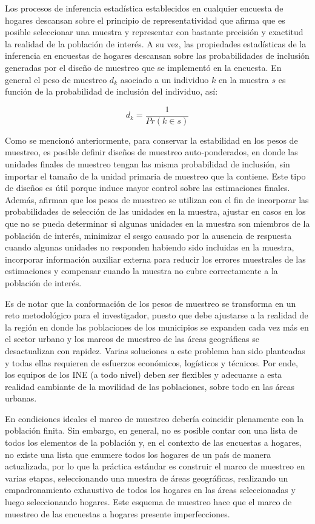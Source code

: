 \documentclass[
  12pt,
]{book}
\begin{document}
Los procesos de inferencia estadística establecidos en cualquier encuesta de hogares descansan sobre el principio de representatividad que afirma que es posible seleccionar una muestra y representar con bastante precisión y exactitud la realidad de la población de interés. A su vez, las propiedades estadísticas de la inferencia en encuestas de hogares descansan sobre las probabilidades de inclusión generadas por el diseño de muestreo que se implementó en la encuesta. En general el peso de muestreo \(d_k\) asociado a un individuo \(k\) en la muestra \(s\) es función de la probabilidad de inclusión del individuo, así:

\[
d_k = \frac{1}{Pr(k\in s)}
\]

Como se mencionó anteriormente, para conservar la estabilidad en los pesos de muestreo, es posible definir diseños de muestreo auto-ponderados, en donde las unidades finales de muestreo tengan las misma probabilidad de inclusión, sin importar el tamaño de la unidad primaria de muestreo que la contiene. Este tipo de diseños es útil porque induce mayor control sobre las estimaciones finales. Además, \citet{Valliant_Dever_2017} afirman que los pesos de muestreo se utilizan con el fin de incorporar las probabilidades de selección de las unidades en la muestra, ajustar en casos en los que no se pueda determinar si algunas unidades en la muestra son miembros de la población de interés, minimizar el sesgo causado por la ausencia de respuesta cuando algunas unidades no responden habiendo sido incluidas en la muestra, incorporar información auxiliar externa para reducir los errores muestrales de las estimaciones y compensar cuando la muestra no cubre correctamente a la población de interés.

Es de notar que la conformación de los pesos de muestreo se transforma en un reto metodológico para el investigador, puesto que debe ajustarse a la realidad de la región en donde las poblaciones de los municipios se expanden cada vez más en el sector urbano y los marcos de muestreo de las áreas geográficas se desactualizan con rapidez. Varias soluciones a este problema han sido planteadas \citep{Gambino_Silva_2009} y todas ellas requieren de esfuerzos económicos, logísticos y técnicos. Por ende, los equipos de los INE (a todo nivel) deben ser flexibles y adecuarse a esta realidad cambiante de la movilidad de las poblaciones, sobre todo en las áreas urbanas.

En condiciones ideales el marco de muestreo debería coincidir plenamente con la población finita. Sin embargo, en general, no es posible contar con una lista de todos los elementos de la población y, en el contexto de las encuestas a hogares, no existe una lista que enumere todos los hogares de un país de manera actualizada, por lo que la práctica estándar es construir el marco de muestreo en varias etapas, seleccionando una muestra de áreas geográficas, realizando un empadronamiento exhaustivo de todos los hogares en las áreas seleccionadas y luego seleccionando hogares. Este esquema de muestreo hace que el marco de muestreo de las encuestas a hogares presente imperfecciones.
\end{document}
